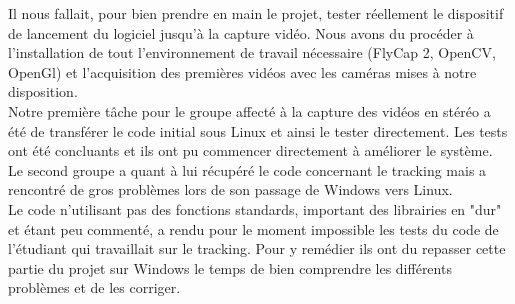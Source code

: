 Il nous fallait, pour bien prendre en main le projet, tester réellement le dispositif de lancement du logiciel jusqu'à la capture vidéo. Nous avons du  procéder à l'installation de tout l'environnement de travail nécessaire (FlyCap 2, OpenCV, OpenGl) et l’acquisition des premières vidéos avec les caméras mises à notre disposition. \\

Notre première tâche pour le groupe affecté à la capture des vidéos en stéréo a été de transférer le code initial sous Linux et ainsi le tester directement. Les tests ont été concluants et ils ont pu commencer directement à améliorer le système. Le second groupe a quant à lui récupéré le code concernant le tracking mais a rencontré de gros problèmes lors de son passage de Windows vers Linux. \\
Le code n'utilisant pas des fonctions standards, important des librairies en "dur" et étant peu commenté, a rendu pour le moment impossible les tests du code de l'étudiant qui travaillait sur le tracking. Pour y remédier ils ont du repasser cette partie du projet sur Windows le temps de bien comprendre les différents problèmes et de les corriger.